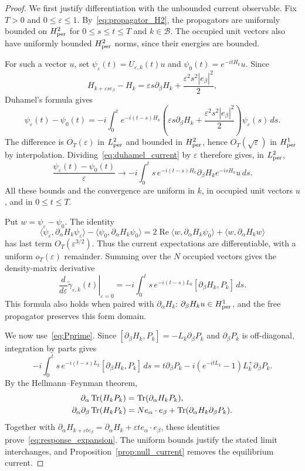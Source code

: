\documentclass[a4paper,11pt]{article}
\theoremstyle{plain}
\theoremstyle{remark}
\def\eps{{\varepsilon}}
\begin{document}
\begin{proof}
We first justify differentiation with the unbounded current observable.
Fix $T>0$ and $0\le\eps\le1$. By~\eqref{eq:propagator_H2}, the
propagators are uniformly bounded on $H^2_{\rm per}$ for
$0\le s\le t\le T$ and $k\in\mathcal B$.
The occupied unit vectors also have uniformly bounded $H^2_{\rm per}$
norms, since their energies are bounded.

For such a vector $u$, set
$\psi_\eps(t)=U_{\eps,k}(t)u$ and $\psi_0(t)=e^{-itH_k}u$.
Since
\[
H_{k+\eps se_\beta}-H_k
=\eps s\partial_\beta H_k+\frac{\eps^2s^2|e_\beta|^2}{2},
\]
Duhamel's formula gives
\begin{equation}\label{eq:duhamel_current}
\psi_\eps(t)-\psi_0(t)
=-i\int_0^t e^{-i(t-s)H_k}
\left(\eps s\partial_\beta H_k+\frac{\eps^2s^2|e_\beta|^2}{2}\right)
\psi_\eps(s)\,ds.
\end{equation}
The difference is $O_T(\eps)$ in $L^2_{\rm per}$ and bounded in
$H^2_{\rm per}$, hence $O_T(\sqrt\eps)$ in $H^1_{\rm per}$ by
interpolation. Dividing~\eqref{eq:duhamel_current} by $\eps$ therefore
gives, in $L^2_{\rm per}$,
\[
\frac{\psi_\eps(t)-\psi_0(t)}{\eps}
\longrightarrow-i\int_0^t s\,e^{-i(t-s)H_k}
\partial_\beta H_ke^{-isH_k}u\,ds.
\]
All these bounds and the convergence are uniform in $k$, in occupied
unit vectors $u$, and in $0\le t\le T$.

Put $w=\psi_\eps-\psi_0$. The identity
\[
\langle\psi_\eps,\partial_\alpha H_k\psi_\eps\rangle
-\langle\psi_0,\partial_\alpha H_k\psi_0\rangle
=2\operatorname{Re}\langle w,\partial_\alpha H_k\psi_0\rangle
+\langle w,\partial_\alpha H_kw\rangle
\]
has last term $O_T(\eps^{3/2})$. Thus the current expectations are
differentiable, with a uniform $o_T(\eps)$ remainder. Summing over the
$N$ occupied vectors gives the density-matrix derivative
\begin{equation}\label{eq:density_derivative}
\left.\frac{d}{d\eps}\widetilde\gamma_{\eps,k}(t)\right|_{\eps=0}
=-i\int_0^t s\,e^{-i(t-s)L_k}[\partial_\beta H_k,P_k]\,ds.
\end{equation}
This formula also holds when paired with $\partial_\alpha H_k$:
$\partial_\beta H_ku\in H^1_{\rm per}$, and the free propagator
preserves this form domain.

We now use~\eqref{eq:Pprime}. Since
$[\partial_\beta H_k,P_k]=-L_k\partial_\beta P_k$ and
$\partial_\beta P_k$ is off-diagonal, integration by parts gives
\[
-i\int_0^t s\,e^{-i(t-s)L_k}[\partial_\beta H_k,P_k]\,ds
=t\partial_\beta P_k-i(e^{-itL_k}-1)L_k^+\partial_\beta P_k.
\]
By the Hellmann--Feynman theorem,
\begin{align*}
\partial_\alpha\Tr(H_kP_k)&=\Tr(\partial_\alpha H_kP_k),\\
\partial_\alpha\partial_\beta\Tr(H_kP_k)
&=N e_\alpha\cdot e_\beta
+\Tr(\partial_\alpha H_k\partial_\beta P_k).
\end{align*}
Together with
$\partial_\alpha H_{k+\eps te_\beta}
=\partial_\alpha H_k+\eps t e_\alpha\cdot e_\beta$,
these identities prove~\eqref{eq:response_expansion}.
The uniform bounds justify the stated limit interchanges, and
Proposition~\ref{prop:null_current} removes the equilibrium current.
\end{proof}
\end{document}
